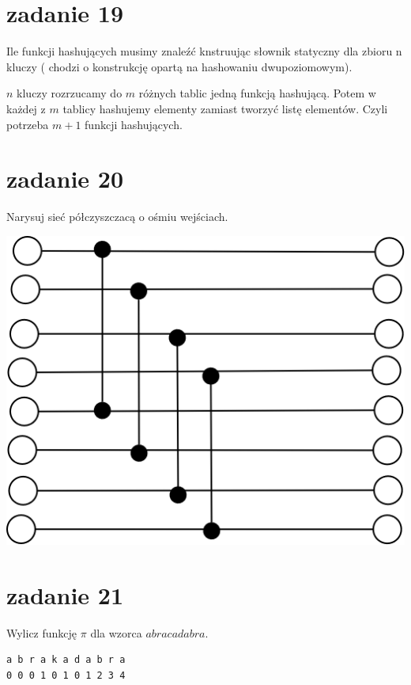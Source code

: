 \section{zadanie 19}
\begin{framed}
Ile funkcji hashujących musimy znaleźć knstruując słownik statyczny dla zbioru n kluczy ( chodzi o konstrukcję opartą na hashowaniu dwupoziomowym).
\end{framed}

$n$ kluczy rozrzucamy do $m$ różnych tablic jedną funkcją hashującą. Potem w każdej z $m$ tablicy hashujemy elementy zamiast tworzyć listę elementów.
Czyli potrzeba $m+1$ funkcji hashujących.

\section{zadanie 20}
\begin{framed}
Narysuj sieć półczyszczacą o ośmiu wejściach.
\end{framed}

\includegraphics[scale=0.55]{images/20.png}

\section{zadanie 21}
\begin{framed}
Wylicz funkcję $\pi$ dla wzorca $abracadabra$.
\end{framed}
\begin{lstlisting}
a b r a k a d a b r a
0 0 0 1 0 1 0 1 2 3 4
\end{lstlisting}

